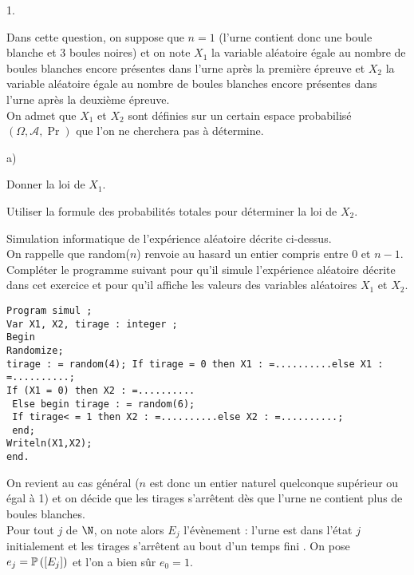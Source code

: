 \documentclass[11pt]{article}%
\begin{document}
\begin{noliste}{1.}
 \setlength{\itemsep}{4mm}

\item Dans cette question, on suppose que $n = 1$ (l'urne contient donc
une boule blanche et 3 boules noires) et on note $X_{1}$ la variable
aléatoire égale au nombre de boules blanches encore présentes dans
l'urne après la première épreuve et $X_{2}$ la variable aléatoire égale
au nombre de boules blanches encore présentes dans l'urne après la
deuxième épreuve. \\
On admet que $X_{1}$ et $X_{2}$ sont définies sur un certain espace
probabilisé $(\Omega, \mathcal{A}, \Pr)$ que l'on ne cherchera pas à
détermine.

\begin{noliste}{a)}
 \setlength{\itemsep}{2mm}

\item Donner la loi de $X_{1}$.

\item Utiliser la formule des probabilités totales pour déterminer la
loi de $X_{2}$.

\item Simulation informatique de l'expérience aléatoire décrite
ci-dessus. \\

On rappelle que random($n$) renvoie au hasard un entier compris entre 0
et $n-1$. \\
Compléter le programme suivant pour qu'il simule l'expérience aléatoire
décrite dans cet exercice et pour qu'il affiche les valeurs des
variables aléatoires $X_{1}$ et $X_{2}$. \\

\begin{verbatim}
Program simul ;
Var X1, X2, tirage : integer ;
Begin
Randomize;
tirage : = random(4); If tirage = 0 then X1 : =..........else X1 :
=..........;
If (X1 = 0) then X2 : =..........
 Else begin tirage : = random(6);
 If tirage< = 1 then X2 : =..........else X2 : =..........;
 end;
Writeln(X1,X2);
end.

\end{verbatim}

\end{noliste}

\end{noliste}

\noindent On revient au cas général ($n$ est donc un entier naturel
quelconque supérieur ou égal à 1) et on décide que les tirages
s'arrêtent dès que l'urne ne contient plus de boules blanches. \\
Pour tout $j$ de $\N$, on note alors $E_{j}$ l'évènement : \og l'urne
est dans l'état $j$ initialement et les tirages s'arrêtent au bout d'un
temps fini \fg. On pose $e_{j} = \mathbb{P}\left(\left[ {E_{j}} \right]\right)$ et l'on
a bien sûr $e_{0} = 1$. \\
\end{document}
